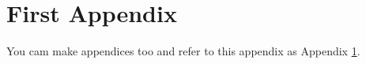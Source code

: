 \documentclass[12pt,letterpaper,fleqn,oneside]{qu-handout}
\begin{document}





\appendix

\section{First Appendix}
\label{sec:appendix}

You cam make appendices too and refer to this appendix as Appendix \ref{sec:appendix}.

\end{document}
